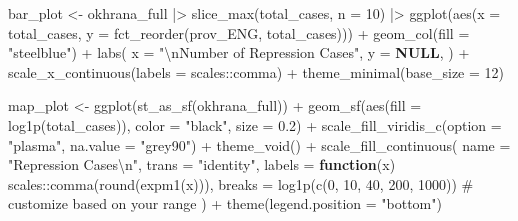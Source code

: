\documentclass[
  11pt,
  letterpaper,
  DIV=11,
  numbers=noendperiod]{scrartcl}
\newenvironment{Shaded}{\begin{snugshade}}{\end{snugshade}}
\newcommand{\AttributeTok}[1]{\textcolor[rgb]{0.16,0.50,0.73}{#1}}
\newcommand{\CommentTok}[1]{\textcolor[rgb]{0.48,0.49,0.49}{#1}}
\newcommand{\ConstantTok}[1]{\textcolor[rgb]{0.15,0.68,0.68}{\textbf{#1}}}
\newcommand{\ControlFlowTok}[1]{\textcolor[rgb]{0.99,0.74,0.29}{\textbf{#1}}}
\newcommand{\DecValTok}[1]{\textcolor[rgb]{0.96,0.45,0.00}{#1}}
\newcommand{\FloatTok}[1]{\textcolor[rgb]{0.96,0.45,0.00}{#1}}
\newcommand{\FunctionTok}[1]{\textcolor[rgb]{0.56,0.27,0.68}{#1}}
\newcommand{\NormalTok}[1]{\textcolor[rgb]{0.81,0.81,0.76}{#1}}
\newcommand{\OtherTok}[1]{\textcolor[rgb]{0.15,0.68,0.38}{#1}}
\newcommand{\SpecialCharTok}[1]{\textcolor[rgb]{0.24,0.68,0.91}{#1}}
\newcommand{\StringTok}[1]{\textcolor[rgb]{0.96,0.31,0.31}{#1}}
\begin{document}
\begin{Shaded}
\begin{Highlighting}[]
\NormalTok{bar\_plot }\OtherTok{\textless{}{-}}\NormalTok{ okhrana\_full }\SpecialCharTok{|\textgreater{}} 
  \FunctionTok{slice\_max}\NormalTok{(total\_cases, }\AttributeTok{n =} \DecValTok{10}\NormalTok{) }\SpecialCharTok{|\textgreater{}} 
  \FunctionTok{ggplot}\NormalTok{(}\FunctionTok{aes}\NormalTok{(}\AttributeTok{x =}\NormalTok{ total\_cases, }
                                 \AttributeTok{y =} \FunctionTok{fct\_reorder}\NormalTok{(prov\_ENG, total\_cases))) }\SpecialCharTok{+}
  \FunctionTok{geom\_col}\NormalTok{(}\AttributeTok{fill =} \StringTok{"steelblue"}\NormalTok{) }\SpecialCharTok{+}
  \FunctionTok{labs}\NormalTok{(}
    \AttributeTok{x =} \StringTok{"}\SpecialCharTok{\textbackslash{}n}\StringTok{Number of Repression Cases"}\NormalTok{,}
    \AttributeTok{y =} \ConstantTok{NULL}\NormalTok{,}
\NormalTok{  ) }\SpecialCharTok{+}
  \FunctionTok{scale\_x\_continuous}\NormalTok{(}\AttributeTok{labels =}\NormalTok{ scales}\SpecialCharTok{::}\NormalTok{comma) }\SpecialCharTok{+}
  \FunctionTok{theme\_minimal}\NormalTok{(}\AttributeTok{base\_size =} \DecValTok{12}\NormalTok{)}

\NormalTok{map\_plot }\OtherTok{\textless{}{-}} \FunctionTok{ggplot}\NormalTok{(}\FunctionTok{st\_as\_sf}\NormalTok{(okhrana\_full)) }\SpecialCharTok{+}
  \FunctionTok{geom\_sf}\NormalTok{(}\FunctionTok{aes}\NormalTok{(}\AttributeTok{fill =} \FunctionTok{log1p}\NormalTok{(total\_cases)), }\AttributeTok{color =} \StringTok{"black"}\NormalTok{, }\AttributeTok{size =} \FloatTok{0.2}\NormalTok{) }\SpecialCharTok{+}
  \FunctionTok{scale\_fill\_viridis\_c}\NormalTok{(}\AttributeTok{option =} \StringTok{"plasma"}\NormalTok{, }\AttributeTok{na.value =} \StringTok{"grey90"}\NormalTok{) }\SpecialCharTok{+}
  \FunctionTok{theme\_void}\NormalTok{() }\SpecialCharTok{+}
  \FunctionTok{scale\_fill\_continuous}\NormalTok{(}
    \AttributeTok{name =} \StringTok{"Repression Cases}\SpecialCharTok{\textbackslash{}n}\StringTok{"}\NormalTok{,}
    \AttributeTok{trans =} \StringTok{"identity"}\NormalTok{,}
    \AttributeTok{labels =} \ControlFlowTok{function}\NormalTok{(x) scales}\SpecialCharTok{::}\FunctionTok{comma}\NormalTok{(}\FunctionTok{round}\NormalTok{(}\FunctionTok{expm1}\NormalTok{(x))),}
    \AttributeTok{breaks =} \FunctionTok{log1p}\NormalTok{(}\FunctionTok{c}\NormalTok{(}\DecValTok{0}\NormalTok{, }\DecValTok{10}\NormalTok{, }\DecValTok{40}\NormalTok{, }\DecValTok{200}\NormalTok{, }\DecValTok{1000}\NormalTok{))  }\CommentTok{\# customize based on your range}
\NormalTok{  ) }\SpecialCharTok{+}
  \FunctionTok{theme}\NormalTok{(}\AttributeTok{legend.position =} \StringTok{"bottom"}\NormalTok{)}


\end{Highlighting}
\end{Shaded}
\end{document}
